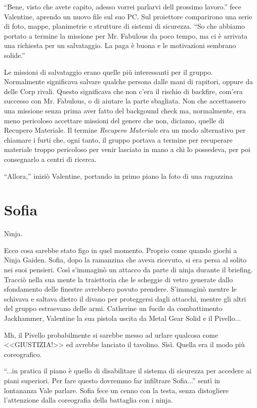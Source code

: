     ``Bene, visto che avete capito, adesso vorrei parlarvi dell prossimo lavoro.'' fece Valentine, aprendo un nuovo file
    sul suo PC. Sul proiettore comparirono una serie di foto, mappe, planimetrie e strutture di sistemi di sicurezza.
    ``So che abbiamo portato a termine la missione per Mr. Fabulous da poco tempo, ma ci è arrivata una richiesta per un
    salvataggio. La paga è buona e le motivazioni sembrano solide.''

    Le missioni di salvataggio erano quelle più interessanti per il gruppo. Normalmente significava salvare qualche
    persona dalle mani di rapitori, oppure da delle Corp rivali. Questo significava che non c'era il rischio di
    backfire, com'era successo con Mr. Fabulous, o di aiutare la parte sbagliata. Non che accettassero una missione
    senza prima aver fatto del backgound check ma, normalmente, era meno pericoloso accettare missioni del genere che
    non, diciamo, quelle di Recupero Materiale. Il termine \emph{Recupero Materiale} era un modo alternativo per
    chiamare i furti che, ogni tanto, il gruppo portava a termine per recuperare materiale troppo pericoloso per venir
    lasciato in mano a chi lo possedeva, per poi consegnarlo a centri di ricerca.

    ``Allora,'' iniziò Valentine, portando in primo piano la foto di una ragazzina

  \section*{Sofia}

    Ninja.

    Ecco cosa sarebbe stato figo in quel momento. Proprio come quando giochi a Ninja Gaiden. Sofia, dopo la ramanzina
    che aveva ricevuto, si era persa al solito nei suoi pensieri. Così s'immaginò un attacco da parte di ninja durante
    il briefing. Tracciò nella sua mente la traiettoria che le scheggie di vetro generate dallo sfondamento delle
    finestre avrebbero povuto prendere. S'immaginò mentre le schivava e saltava dietro il divano per proteggersi dagli
    attacchi, mentre gli altri del gruppo estraevano delle armi. Catherine un fucile da combattimento Jackhammer,
    Valentine la sua pistola uscita da Metal Gear Solid e il Pivello...

    Mh, il Pivello probabilmente si sarebbe messo ad urlare qualcosa come <<GIUSTIZIA!>> ed avrebbe lanciato il
    tavolino. Sìsì. Quella era il modo più coreografico.

    ``...in pratica il piano è quello di disabilitare il sistema di sicurezza per accedere ai piani superiori. Per fare
    questo dovremmo far infiltrare Sofia...'' sentì in lontananza Vale parlare. Sofia fece un cenno con la testa, senza
    distogliere l'attenzione dalla coreografia della battaglia con i ninja.

